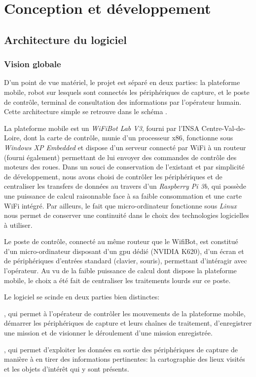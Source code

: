 \chapter{Conception et développement}

	\section{Architecture du logiciel}

		\subsection{Vision globale}
			
			D'un point de vue matériel, le projet est séparé en deux parties: la plateforme mobile, robot sur lesquels sont connectés les périphériques de capture, et le poste de contrôle, terminal de consultation des informations par l'opérateur humain. Cette architecture simple se retrouve dans le schéma \todoref.
			\par
			La plateforme mobile est un \emph{WiFiBot Lab V3}\cite{wifibot}, fourni par l'INSA Centre-Val-de-Loire, dont la carte de contrôle, munie d'un processeur x86, fonctionne sous \emph{Windows XP Embedded} et dispose d'un serveur connecté par WiFi à un routeur (fourni également) permettant de lui envoyer des commandes de contrôle des moteurs des roues. Dans un souci de conservation de l'existant et par simplicité de développement, nous avons choisi de contrôler les périphériques et de centraliser les transfers de données au travers d'un \emph{Raspberry Pi 3b}, qui possède une puissance de calcul raisonnable face à sa faible consommation et une carte WiFi intégré. Par ailleurs, le fait que micro-ordinateur fonctionne sous \emph{Linux} nous permet de conserver une continuité dans le choix des technologies logicielles à utiliser.
			\par
			Le poste de contrôle, connecté au même routeur que le WifiBot, est constitué d'un micro-ordinateur disposant d'un \gls{gpu} dédié (NVIDIA K620), d'un écran et de périphériques d'entrées standard (clavier, souris), permettant d'intéragir avec l'opérateur. Au vu de la faible puissance de calcul dont dispose la plateforme mobile, le choix a été fait de centraliser les traitements lourds sur ce poste.
			\par
			Le logiciel se scinde en deux parties bien distinctes:
			\begin{description}[noitemsep]
				\item[l'Interface Homme-Machine], qui permet à l'opérateur de contrôler les mouvements de la plateforme mobile, démarrer les périphériques de capture et leurs chaînes de traitement, d'enregistrer une mission et de visionner le déroulement d'une mission enregistrée.
				\item[le réseau de traitement de données], qui permet d'exploiter les données en sortie des périphériques de capture de manière à en tirer des informations pertinentes: la cartographie des lieux visités et les objets d'intérêt qui y sont présents.
			\end{description}
